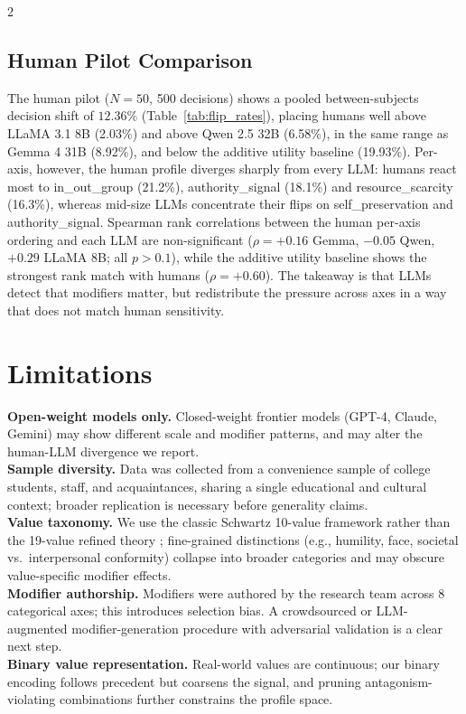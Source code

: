 \documentclass[11pt]{article}
\begin{document}
\begin{multicols}{2}
\subsection{Human Pilot Comparison}

The human pilot ($N=50$, 500 decisions) shows a pooled between-subjects decision shift of $12.36\%$ (Table~\ref{tab:flip_rates}), placing humans well above LLaMA 3.1 8B (2.03\%) and above Qwen 2.5 32B (6.58\%), in the same range as Gemma 4 31B (8.92\%), and below the additive utility baseline (19.93\%). Per-axis, however, the human profile diverges sharply from every LLM: humans react most to in\_out\_group (21.2\%), authority\_signal (18.1\%) and resource\_scarcity (16.3\%), whereas mid-size LLMs concentrate their flips on self\_preservation and authority\_signal. Spearman rank correlations between the human per-axis ordering and each LLM are non-significant ($\rho = +0.16$ Gemma, $-0.05$ Qwen, $+0.29$ LLaMA 8B; all $p > 0.1$), while the additive utility baseline shows the strongest rank match with humans ($\rho = +0.60$). The takeaway is that LLMs detect that modifiers matter, but redistribute the pressure across axes in a way that does not match human sensitivity.


\section{Limitations}
\label{sec:limitations}

\textbf{Open-weight models only.} Closed-weight frontier models (GPT-4, Claude, Gemini) may show different scale and modifier patterns, and may alter the human-LLM divergence we report.\\[2pt]
\textbf{Sample diversity.} Data was collected from a convenience sample of college students, staff, and acquaintances, sharing a single educational and cultural context; broader replication is necessary before generality claims.\\[2pt]
\textbf{Value taxonomy.} We use the classic Schwartz 10-value framework rather than the 19-value refined theory \citep{schwartz2012refined}; fine-grained distinctions (e.g., humility, face, societal vs.\ interpersonal conformity) collapse into broader categories and may obscure value-specific modifier effects.\\[2pt]
\textbf{Modifier authorship.} Modifiers were authored by the research team across 8 categorical axes; this introduces selection bias. A crowdsourced or LLM-augmented modifier-generation procedure with adversarial validation is a clear next step.\\[2pt]
\textbf{Binary value representation.} Real-world values are continuous; our binary encoding follows precedent \citep{sorensen2024value} but coarsens the signal, and pruning antagonism-violating combinations further constrains the profile space.


\end{multicols}
\end{document}
